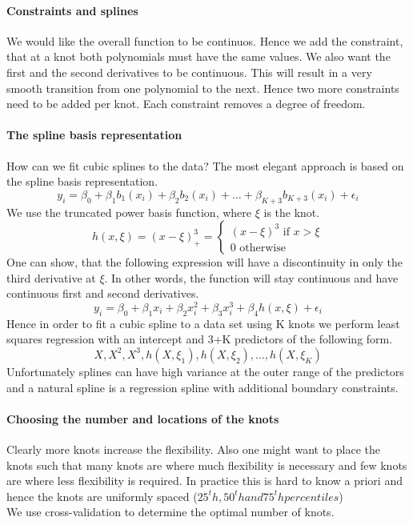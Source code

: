 \documentclass[../document.tex]{subfiles}
\begin{document}
	\paragraph{Constraints and splines}
	We would like the overall function to be continuos. Hence we add the constraint, that at a knot both polynomials must have the same values. We also want the first and the second derivatives to be continuous. This will result in a very smooth transition from one polynomial to the next. Hence two more constraints need to be added per knot. Each constraint removes a degree of freedom.

	\paragraph{The spline basis representation}
	How can we fit cubic splines to the data? The most elegant approach is based on the spline basis representation.
	\begin{equation}
		y_{i}=\beta_{0}+\beta_{1}b_{1}(x_{i})+\beta_{2}b_{2}(x_{i})+...+\beta_{K+3}b_{K+3}(x_{i})+\epsilon_{i}
	\end{equation}
	We use the truncated power basis function, where \(\xi\) is the knot.
	\begin{equation}
		h(x,\xi)=(x-\xi)_{+}^3=
		\begin{cases}
			(x-\xi)^3 \text{  if  } x > \xi\\
			0 \text{  otherwise  }
		\end{cases}
	\end{equation}
	One can show, that the following expression will have a discontinuity in only the third derivative at \(\xi\). In other words, the function will stay continuous and have continuous first and second derivatives.
	\begin{equation}
		y_{i}=\beta_{0}+\beta_{1}x_{i}+\beta_{2}x_{i}^2+\beta_{3}x_{i}^3+\beta_{4}h(x,\xi)+\epsilon_{i}
	\end{equation}
	Hence in order to fit a cubic spline to a data set using K knots we perform least squares regression with an intercept and 3+K predictors of the following form.
	\begin{equation}
		X, X^2, X^3, h(X,\xi_{1}),h(X,\xi_{2}),...,h(X,\xi_{K})
	\end{equation}
	Unfortunately splines can have high variance at the outer range of the predictors and a natural spline is a regression spline with additional boundary constraints.

	\paragraph{Choosing the number and locations of the knots}
	Clearly more knots increase the flexibility. Also one might want to place the knots such that many knots are where much flexibility is necessary and few knots are where less flexibility is required. In practice this is hard to know a priori and hence the knots are uniformly spaced (\(25^th,50^th and 75^th percentiles\))\\
	We use cross-validation to determine the optimal number of knots.
\end{document}
